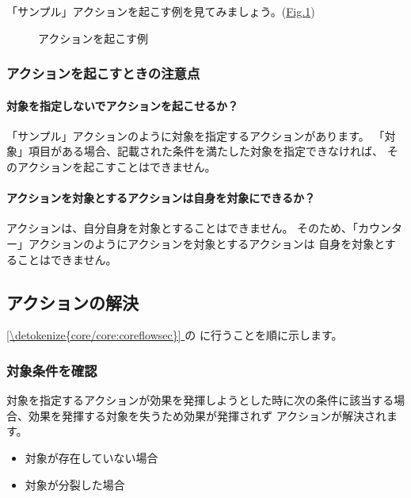 \documentclass[letterpaper,10pt,dvipdfmx]{sphinxmanual}
\begin{document}
\sphinxAtStartPar
「サンプル」アクションを起こす例を見てみましょう。(\hyperref[\detokenize{common/common:action-sample2}]{Fig.\@ \ref{\detokenize{common/common:action-sample2}}})

\begin{figure}[htbp]
\centering
\capstart

\noindent{}
\caption{アクションを起こす例}\label{\detokenize{common/common:id56}}\label{\detokenize{common/common:action-sample2}}\end{figure}


\subsubsection{アクションを起こすときの注意点}
\label{\detokenize{common/common:id22}}

\paragraph{対象を指定しないでアクションを起こせるか？}
\label{\detokenize{common/common:id23}}
\sphinxAtStartPar
「サンプル」アクションのように対象を指定するアクションがあります。
「対象」項目がある場合、記載された条件を満たした対象を指定できなければ、
そのアクションを起こすことはできません。


\paragraph{アクションを対象とするアクションは自身を対象にできるか？}
\label{\detokenize{common/common:id24}}
\sphinxAtStartPar
アクションは、自分自身を対象とすることはできません。
そのため、「カウンター」アクションのようにアクションを対象とするアクションは
自身を対象とすることはできません。


\subsection{アクションの解決}
\label{\detokenize{common/common:id25}}
\sphinxAtStartPar
\hyperref[\detokenize{core/core:coreflowsec}]{\ref{\detokenize{core/core:coreflowsec}} } の
{\hyperref[\detokenize{core/core:actresolve}]{}} に行うことを順に示します。


\subsubsection{対象条件を確認}
\label{\detokenize{common/common:id26}}
\sphinxAtStartPar
対象を指定するアクションが効果を発揮しようとした時に次の条件に該当する場合、効果を発揮する対象を失うため効果が発揮されず
アクションが解決されます。
\begin{itemize}
\item {} 
\sphinxAtStartPar
対象が存在していない場合

\item {} 
\sphinxAtStartPar
対象が分裂した場合

\end{itemize}
\end{document}
